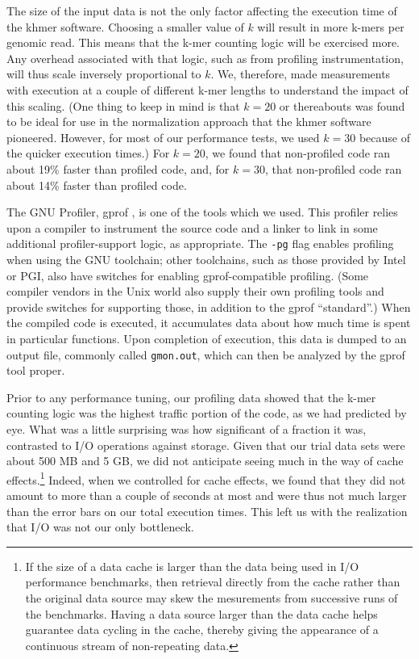 The size of the input data is not the only factor affecting the execution time
of the khmer software. Choosing a smaller value of $k$ will result in more
k-mers per genomic read. This means that the k-mer counting logic will be
exercised more. Any overhead associated with that logic, such as from profiling
instrumentation, will thus scale inversely proportional to $k$. We, therefore,
made measurements with execution at a couple of different k-mer lengths to
understand the impact of this scaling. (One thing to keep in mind is that $k =
20$ or thereabouts was found to be ideal for use in the normalization approach
that the khmer software pioneered. However, for most of our performance tests,
we used $k = 30$ because of the quicker execution times.) For $k = 20$, we
found that non-profiled code ran about 19\% faster than profiled code, and, for
$k = 30$, that non-profiled code ran about 14\% faster than profiled code.

The GNU Profiler, gprof \citep{web:gprof}, is one of the tools which we used.
This profiler relies upon a compiler to instrument the source code and a linker
to link in some additional profiler-support logic, as appropriate. The
\texttt{-pg} flag enables profiling when using the GNU toolchain; other
toolchains, such as those provided by Intel or PGI, also have switches for
enabling gprof-compatible profiling. (Some compiler vendors in the Unix world
also supply their own profiling tools and provide switches for supporting
those, in addition to the gprof ``standard''.) When the compiled code is
executed, it accumulates data about how much time is spent in particular
functions. Upon completion of execution, this data is dumped to an output file,
commonly called \texttt{gmon.out}, which can then be analyzed by the gprof tool
proper.

Prior to any performance tuning, our profiling data showed that the k-mer
counting logic was the highest traffic portion of the code, as we had predicted
by eye. What was a little surprising was how significant of a fraction it was,
contrasted to I/O operations against storage. Given that our trial data sets
were about 500 MB and 5 GB, we did not anticipate seeing much in the way of
cache effects.\footnote{If the size of a data cache is larger than the data
being used in I/O performance benchmarks, then retrieval directly from the
cache rather than the original data source may skew the mesurements from
successive runs of the benchmarks. Having a data source larger than the data
cache helps guarantee data cycling in the cache, thereby giving the appearance
of a continuous stream of non-repeating data.} Indeed, when we controlled for
cache effects, we found that they did not amount to more than a couple of
seconds at most and were thus not much larger than the error bars on our total
execution times.  This left us with the realization that I/O was not our only
bottleneck.

